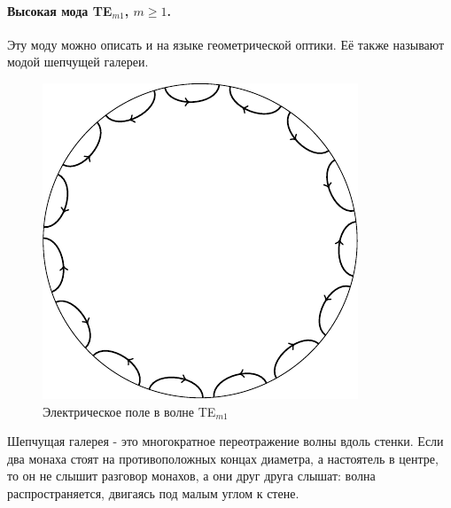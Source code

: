 \newpage
\paragraph{Высокая мода TE$_{m1}$, $m\geq 1$.} Эту моду можно описать и на языке геометрической оптики. Её также называют модой шепчущей галереи.
\begin{figure}[H]
	\centering
	\includegraphics[scale=1.5]{img_lect5/cylindric/TEm1}
	\caption{Электрическое поле в волне TE$_{m1}$}
	\label{fig:cylinder:TMm1}
\end{figure}

Шепчущая галерея - это многократное переотражение волны вдоль стенки. Если два монаха стоят на противоположных концах диаметра, а настоятель в центре, то он не слышит разговор монахов, а они друг друга слышат: волна распространяется, двигаясь под малым углом к стене.
